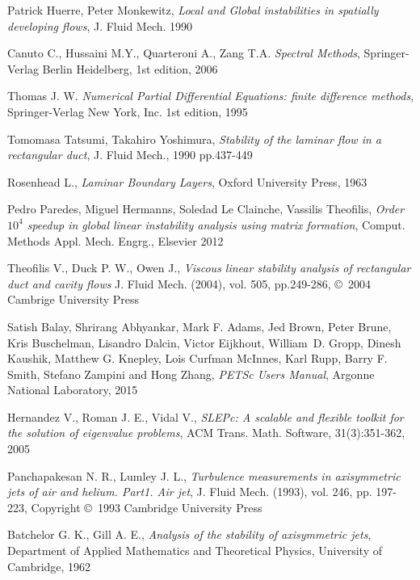 \documentclass[pdftex,12pt,a4paper,oneside]{report}
\begin{document}
\renewcommand{\bibname}{References}
\begin{thebibliography}{56}

Patrick Huerre, Peter Monkewitz,
\emph{Local and Global instabilities in spatially developing flows},
J. Fluid Mech. 1990


Canuto C., Hussaini M.Y., Quarteroni A., Zang T.A.
\emph{Spectral Methods},
Springer-Verlag Berlin Heidelberg,
1st edition,
2006

Thomas J. W.
\emph{Numerical Partial Differential Equations: finite difference methods},
Springer-Verlag New York, Inc.
1st edition,
1995

Tomomasa Tatsumi, Takahiro Yoshimura, 
\emph{Stability of the laminar flow in a rectangular duct},
J. Fluid Mech., 1990 pp.437-449

Rosenhead L.,
\emph{Laminar Boundary Layers},
Oxford University Press, 1963

Pedro Paredes, Miguel Hermanns, Soledad Le Clainche, Vassilis Theofilis,
\emph{Order $10^4$ speedup in global linear instability analysis using matrix formation},
Comput. Methods Appl. Mech. Engrg.,
Elsevier 2012

Theofilis V., Duck P. W., Owen J.,
\emph{Viscous linear stability analysis of rectangular duct and cavity flows}
J. Fluid Mech. (2004), vol. 505, pp.249-286,
\copyright\ 2004 Cambrige University Press

Satish Balay, Shrirang Abhyankar, Mark F. Adams, Jed Brown, Peter Brune,
Kris Buschelman, Lisandro Dalcin, Victor Eijkhout,  William~D. Gropp,
Dinesh Kaushik, Matthew G. Knepley, Lois Curfman McInnes, Karl Rupp, Barry F. Smith,
Stefano Zampini and Hong Zhang,
\emph{PETSc Users Manual},
Argonne National Laboratory, 
2015

Hernandez V., Roman J. E., Vidal V.,
\emph{SLEPc: A scalable and flexible toolkit for the solution of eigenvalue problems},
ACM Trans. Math. Software, 31(3):351-362,
2005

Panchapakesan N. R., Lumley J. L.,
\emph{Turbulence measurements in axisymmetric jets of air and helium. Part1. Air jet},
J. Fluid Mech. (1993), vol. 246, pp. 197-223,
Copyright \copyright\ 1993 Cambridge University Press

Batchelor G. K., Gill A. E.,
\emph{Analysis of the stability of axisymmetric jets},
Department of Applied Mathematics and Theoretical Physics,
University of Cambridge, 1962

\end{thebibliography}
%
\printindex
\end{document}
